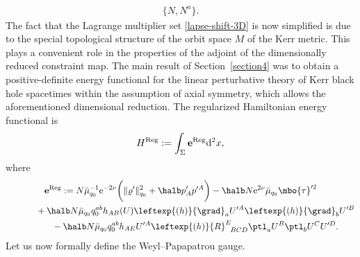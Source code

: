 	\begin{align} \label{lapse-shift-3D}
	\{ N, N^a \}.
	\end{align}
	The fact that the Lagrange multiplier set \eqref{lapse-shift-3D} is now simplified is due to the special topological
	structure of the orbit space $M$ of the Kerr metric. This plays a convenient role in the properties of the adjoint of the dimensionally reduced constraint map.
	The main result of Section~\ref{section4} was to obtain a positive-definite energy functional for the linear perturbative theory of Kerr black hole spacetimes within the assumption of axial symmetry, which allows the aforementioned dimensional reduction. The regularized Hamiltonian energy functional is
\begin{align*}
	H^{{\rm Reg}} := \int_{\Sigma} \mathbf{e}^{{\rm Reg}} {\rm d}^2x,
	\end{align*}
where
	\begin{gather*}
	\mathbf{e}^{{\rm Reg}} := N \bar{\mu}^{-1}_{q_0} {\rm e}^{-2 \nu} \biggl(\Vert \varrho' \Vert_{q_0}^2 + \halb p'_A p'^A\biggr) - \halb N {\rm e}^{2 \nu} \bar{\mu}_{q_0} \mbo{\tau}'^2 \notag\\
	\hphantom{\mathbf{e}^{{\rm Reg}} :=}{}+ \halb N \bar{\mu}_{q_0} q^{ab}_0 h_{AB}(U) \leftexp{(h)}{\grad}_a U'^A \leftexp{(h)}{\grad}_b U'^B \notag\\
	\hphantom{\mathbf{e}^{{\rm Reg}} :=}{}- \halb N \bar{\mu}_{q_0} q_0^{ab} h_{AE} U'^A \leftexp{(h)}{R}^E_{\,\,\,\, BCD} \ptl_a U^B \ptl_b U^C U'^D.
	\end{gather*}
	Let us now formally define the Weyl--Papapatrou gauge.
